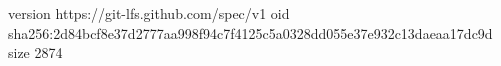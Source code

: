 version https://git-lfs.github.com/spec/v1
oid sha256:2d84bcf8e37d2777aa998f94c7f4125c5a0328dd055e37e932c13daeaa17dc9d
size 2874

